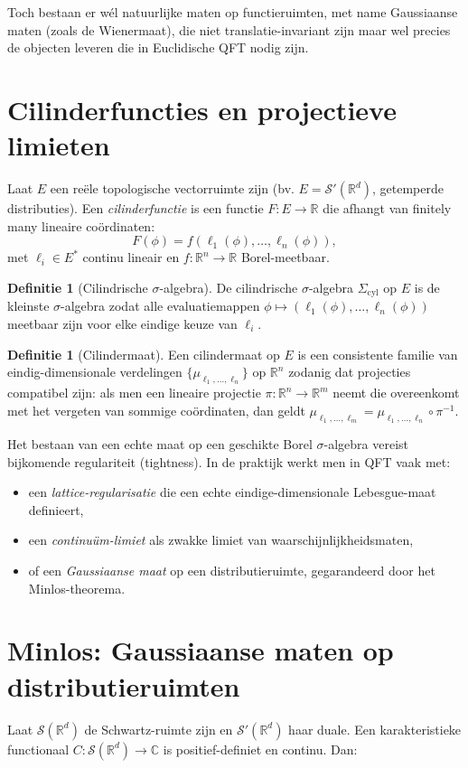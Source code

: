 \documentclass[11pt,a4paper,oneside]{book}
\theoremstyle{plain}
\theoremstyle{definition}
\newtheorem{definition}[theorem]{Definitie}
\newcommand{\R}{\mathbb{R}}
\newcommand{\C}{\mathbb{C}}
\newcommand{\cS}{\mathcal{S}}
\begin{document}
	Toch bestaan er wél natuurlijke maten op functieruimten, met name Gaussiaanse maten (zoals de Wienermaat),
	die niet translatie-invariant zijn maar wel precies de objecten leveren die in Euclidische QFT nodig zijn.
	
	\section{Cilinderfuncties en projectieve limieten}
	Laat $E$ een reële topologische vectorruimte zijn (bv. $E=\cS'(\R^d)$, getemperde distributies).
	Een \emph{cilinderfunctie} is een functie $F:E\to\R$ die afhangt van finitely many lineaire coördinaten:
	\[
	F(\phi)=f(\ell_1(\phi),\dots,\ell_n(\phi)),
	\]
	met $\ell_i\in E^\ast$ continu lineair en $f:\R^n\to\R$ Borel-meetbaar.
	
	\begin{definition}[Cilindrische $\sigma$-algebra]
		De cilindrische $\sigma$-algebra $\Sigma_{\mathrm{cyl}}$ op $E$ is de kleinste $\sigma$-algebra zodat alle
		evaluatiemappen $\phi\mapsto (\ell_1(\phi),\dots,\ell_n(\phi))$ meetbaar zijn voor elke eindige keuze van $\ell_i$.
	\end{definition}
	
	\begin{definition}[Cilindermaat]
		Een cilindermaat op $E$ is een consistente familie van eindig-dimensionale verdelingen $\{\mu_{\ell_1,\dots,\ell_n}\}$
		op $\R^n$ zodanig dat projecties compatibel zijn: als men een lineaire projectie $\pi:\R^n\to\R^m$ neemt die overeenkomt
		met het vergeten van sommige coördinaten, dan geldt $\mu_{\ell_1,\dots,\ell_m} = \mu_{\ell_1,\dots,\ell_n}\circ \pi^{-1}$.
	\end{definition}
	
	Het bestaan van een echte maat op een geschikte Borel $\sigma$-algebra vereist bijkomende regulariteit (tightness).
	In de praktijk werkt men in QFT vaak met:
	\begin{itemize}[leftmargin=*]
		\item een \emph{lattice-regularisatie} die een echte eindige-dimensionale Lebesgue-maat definieert,
		\item een \emph{continuüm-limiet} als zwakke limiet van waarschijnlijkheidsmaten,
		\item of een \emph{Gaussiaanse maat} op een distributieruimte, gegarandeerd door het Minlos-theorema.
	\end{itemize}
	
	\section{Minlos: Gaussiaanse maten op distributieruimten}
	Laat $\cS(\R^d)$ de Schwartz-ruimte zijn en $\cS'(\R^d)$ haar duale. Een karakteristieke functionaal
	$C:\cS(\R^d)\to\C$ is positief-definiet en continu. Dan:
	
\end{document}
